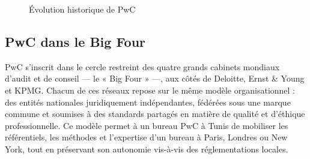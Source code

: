 \documentclass[12pt,a4paper,twoside]{report}
\begin{document}
\begin{figure}[H]
\centering
{}
\caption{Évolution historique de PwC}
\label{fig:pwc_timeline}
\end{figure}

\subsection{PwC dans le Big Four}

PwC s'inscrit dans le cercle restreint des quatre grands cabinets mondiaux d'audit et de conseil --- le « Big Four » ---, aux côtés de Deloitte, Ernst \& Young et KPMG. Chacun de ces réseaux repose sur le même modèle organisationnel : des entités nationales juridiquement indépendantes, fédérées sous une marque commune et soumises à des standards partagés en matière de qualité et d'éthique professionnelle. Ce modèle permet à un bureau PwC à Tunis de mobiliser les référentiels, les méthodes et l'expertise d'un bureau à Paris, Londres ou New York, tout en préservant son autonomie vis-à-vis des réglementations locales.
\end{document}

